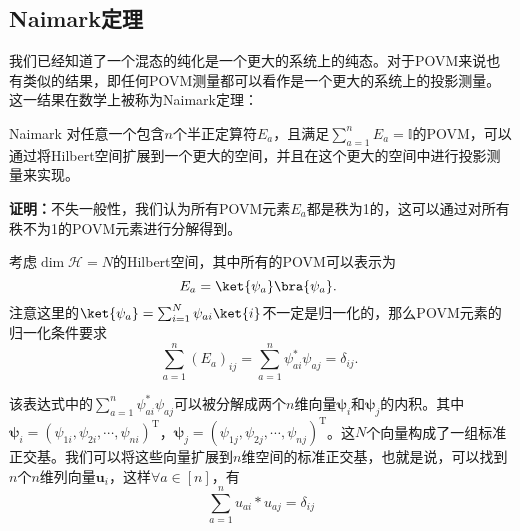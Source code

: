 \subsection{Naimark定理}
我们已经知道了一个混态的纯化是一个更大的系统上的纯态。对于POVM来说也有类似的结果，即任何POVM测量都可以看作是一个更大的系统上的投影测量。这一结果在数学上被称为Naimark定理：
\begin{theorem}{Naimark}
对任意一个包含$n$个半正定算符$E_a$，且满足$\sum_{a=1}^n E_a=\mathbb{I}$的POVM，可以通过将Hilbert空间扩展到一个更大的空间，并且在这个更大的空间中进行投影测量来实现。
\end{theorem}

\noindent\textbf{证明：}不失一般性，我们认为所有POVM元素$E_a$都是秩为1的，这可以通过对所有秩不为1的POVM元素进行分解得到。

考虑$\operatorname{dim}\mathcal{H}=N$的Hilbert空间，其中所有的POVM可以表示为
\begin{equation}
E_a=\ket{\psi_a}\bra{\psi_a}.~
\end{equation}
注意这里的$\ket{\psi_a}=\sum_{i=1}^N\psi_{ai}\ket{i}$不一定是归一化的，那么POVM元素的归一化条件要求
\begin{equation}
\sum_{a=1}^n\left(E_a\right)_{i j}=\sum_{a=1}^n \psi_{a i}^* \psi_{a j}=\delta_{i j}.~
\end{equation}

该表达式中的$\sum_{a=1}^n \psi_{a i}^* \psi_{a j}$可以被分解成两个$n$维向量$\boldsymbol{\psi}_i$和$\boldsymbol{\psi}_j$的内积。其中$\boldsymbol{\psi}_i=\left(\psi_{1 i}, \psi_{2 i}, \cdots, \psi_{n i}\right)^{\mathrm{T}}$，$\boldsymbol{\psi}_j=\left(\psi_{1 j}, \psi_{2 j}, \cdots, \psi_{n j}\right)^{\mathrm{T}}$。这$N$个向量构成了一组标准正交基。我们可以将这些向量扩展到$n$维空间的标准正交基，也就是说，可以找到$n$个$n$维列向量$\boldsymbol{u}_i$，这样$\forall a\in[n]$，有
\begin{equation}
\sum_{a=1}^n u_{a i}*u_{a j}=\delta_{ij}
\end{equation}
